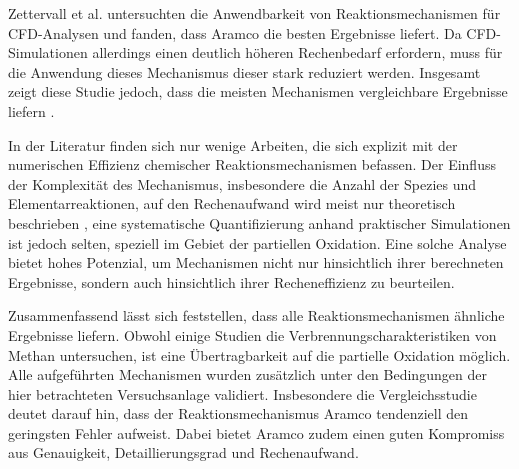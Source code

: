            Zettervall et al. untersuchten die Anwendbarkeit von Reaktionsmechanismen für CFD-Analysen und fanden, dass Aramco die besten Ergebnisse liefert. Da CFD-Simulationen allerdings einen deutlich höheren Rechenbedarf erfordern, muss für die Anwendung dieses Mechanismus dieser stark reduziert werden. Insgesamt zeigt diese Studie jedoch, dass die meisten Mechanismen vergleichbare Ergebnisse liefern \cite{fuels2020013}. 

            In der Literatur finden sich nur wenige Arbeiten, die sich explizit mit der numerischen Effizienz chemischer Reaktionsmechanismen befassen. Der Einfluss der Komplexität des Mechanismus, insbesondere die Anzahl der Spezies und Elementarreaktionen, auf den Rechenaufwand wird meist nur theoretisch beschrieben \parencite{Niemeyer2016, CURTIS2017312}, eine systematische Quantifizierung anhand praktischer Simulationen ist jedoch selten, speziell im Gebiet der partiellen Oxidation. 
            Eine solche Analyse bietet hohes Potenzial, um Mechanismen nicht nur hinsichtlich ihrer berechneten Ergebnisse, sondern auch hinsichtlich ihrer Recheneffizienz zu beurteilen. 

            Zusammenfassend lässt sich feststellen, dass alle Reaktionsmechanismen ähnliche Ergebnisse liefern. Obwohl einige Studien die Verbrennungscharakteristiken von Methan untersuchen, ist eine Übertragbarkeit auf die partielle Oxidation möglich. Alle aufgeführten Mechanismen wurden zusätzlich unter den Bedingungen der hier betrachteten Versuchsanlage validiert. Insbesondere die Vergleichsstudie deutet darauf hin, dass der Reaktionsmechanismus Aramco tendenziell den geringsten Fehler aufweist. Dabei bietet Aramco zudem einen guten Kompromiss aus Genauigkeit, Detaillierungsgrad und Rechenaufwand.